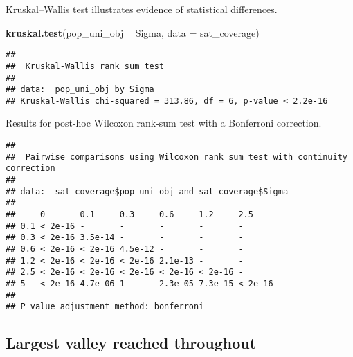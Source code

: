 \documentclass[]{book}
\newenvironment{Shaded}{\begin{snugshade}}{\end{snugshade}}
\newcommand{\DataTypeTok}[1]{\textcolor[rgb]{0.13,0.29,0.53}{#1}}
\newcommand{\KeywordTok}[1]{\textcolor[rgb]{0.13,0.29,0.53}{\textbf{#1}}}
\newcommand{\NormalTok}[1]{#1}
\newcommand{\OperatorTok}[1]{\textcolor[rgb]{0.81,0.36,0.00}{\textbf{#1}}}
\newcommand{\OtherTok}[1]{\textcolor[rgb]{0.56,0.35,0.01}{#1}}
\newcommand{\StringTok}[1]{\textcolor[rgb]{0.31,0.60,0.02}{#1}}
\begin{document}
Kruskal--Wallis test illustrates evidence of statistical differences.

\begin{Shaded}
\begin{Highlighting}[]
\KeywordTok{kruskal.test}\NormalTok{(pop_uni_obj }\OperatorTok{~}\StringTok{ }\NormalTok{Sigma, }\DataTypeTok{data =}\NormalTok{ sat_coverage)}
\end{Highlighting}
\end{Shaded}

\begin{verbatim}
## 
##  Kruskal-Wallis rank sum test
## 
## data:  pop_uni_obj by Sigma
## Kruskal-Wallis chi-squared = 313.86, df = 6, p-value < 2.2e-16
\end{verbatim}

Results for post-hoc Wilcoxon rank-sum test with a Bonferroni correction.

\begin{Shaded}
\end{Shaded}

\begin{verbatim}
## 
##  Pairwise comparisons using Wilcoxon rank sum test with continuity correction 
## 
## data:  sat_coverage$pop_uni_obj and sat_coverage$Sigma 
## 
##     0       0.1     0.3     0.6     1.2     2.5    
## 0.1 < 2e-16 -       -       -       -       -      
## 0.3 < 2e-16 3.5e-14 -       -       -       -      
## 0.6 < 2e-16 < 2e-16 4.5e-12 -       -       -      
## 1.2 < 2e-16 < 2e-16 < 2e-16 2.1e-13 -       -      
## 2.5 < 2e-16 < 2e-16 < 2e-16 < 2e-16 < 2e-16 -      
## 5   < 2e-16 4.7e-06 1       2.3e-05 7.3e-15 < 2e-16
## 
## P value adjustment method: bonferroni
\end{verbatim}

\hypertarget{largest-valley-reached-throughout-14}{%
\subsection{Largest valley reached throughout}\label{largest-valley-reached-throughout-14}}
\end{document}
